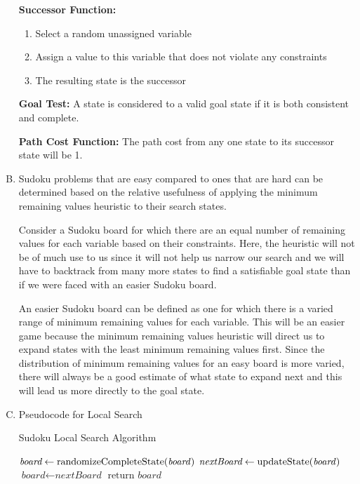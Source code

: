 \documentclass[10pt,a4paper]{article}
\begin{document}
\begin{enumerate}[A.]
		\textbf{Successor Function:}  
		
		\begin{enumerate}[1.]
			\item Select a random unassigned variable 
			\item Assign a value to this variable that does not violate any constraints
			\item The resulting state is the successor
		\end{enumerate}
		
		\textbf{Goal Test:} A state is considered to a valid goal state if it is both consistent and complete.
		
		\textbf{Path Cost Function:} The path cost from any one state to its successor state will be 1.
		
		\item 

		Sudoku problems that are easy compared to ones that are hard can be determined based on the relative usefulness of applying the minimum remaining values heuristic to their search states. 
		
		Consider a Sudoku board for which there are an equal number of remaining values for each variable based on their constraints. Here, the heuristic will not be of much use to us since it will not help us narrow our search and we will have to backtrack from many more states to find a satisfiable goal state than if we were faced with an easier Sudoku board.
		
		An easier Sudoku board can be defined as one for which there is a varied range of minimum remaining values for each variable. This will be an easier game because the minimum remaining values heuristic will direct us to expand states with the least minimum remaining values first. Since the distribution of minimum remaining values for an easy board is more varied, there will always be a good estimate of what state to expand next and this will lead us more directly to the goal state.

		\item Pseudocode for Local Search

		\begin{algorithm}[H]
			\caption{Sudoku Local Search Algorithm}\label{euclid}
			\begin{algorithmic}[1]
				\State $\textit{board} \gets \text{randomizeCompleteState(\textit{board})}$
				\State $\textit{nextBoard} \gets \text{updateState(\textit{board})}$
				\State $\textit{board} \gets \textit{nextBoard}$
				\EndIf
				\EndWhile
				\State $\text{return }\textit{board}$
				\EndProcedure
			\end{algorithmic}
		\end{algorithm} 
	

\end{enumerate}
\end{document}

